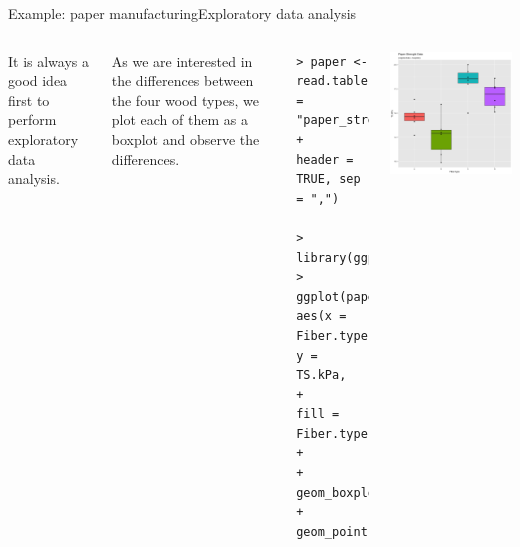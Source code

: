 \begin{frame}[fragile]{Example: paper manufacturing}{Exploratory data analysis}
\begin{columns}
  It is always a good idea first to perform exploratory data analysis.\medskip

  As we are interested in the differences between the four wood types, we plot each of them as a boxplot and observe the differences.

  {\smaller
  \begin{verbatim}
> paper <- read.table(file = "paper_strength.csv",
+                     header = TRUE, sep    = ",")

> library(ggplot2)
> ggplot(paper, aes(x = Fiber.type, y = TS.kPa,
+                   fill = Fiber.type)) +
+        geom_boxplot() + geom_point()
  \end{verbatim}}

  \includegraphics[width=1\textwidth]{../img/paperboxplot.png}
\end{columns}

\end{frame}




